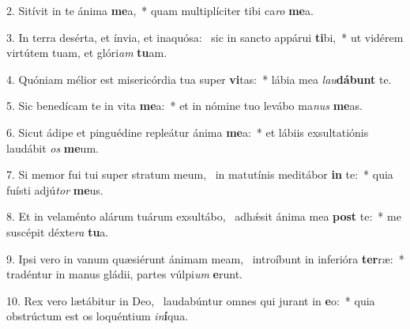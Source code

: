 2. Sitívit in te ánima \textbf{me}a,~*  quam multiplíciter tibi ca\textit{ro} \textbf{me}a.\

3. In terra desérta, et ínvia, et inaquósa: \dag\  sic in sancto appárui \textbf{ti}bi,~*  ut vidérem virtútem tuam, et glóri\textit{am} \textbf{tu}am.\

4. Quóniam mélior est misericórdia tua super \textbf{vi}tas:~*  lábia mea \textit{lau}\textbf{dá}\textbf{bunt} te.\

5. Sic benedícam te in vita \textbf{me}a:~*  et in nómine tuo levábo ma\textit{nus} \textbf{me}as.\

6. Sicut ádipe et pinguédine repleátur ánima \textbf{me}a:~*  et lábiis exsultatiónis laudábit \textit{os} \textbf{me}um.\

7. Si memor fui tui super stratum meum, \dag\  in matutínis meditábor \textbf{in} te:~*  quia fuísti adjú\textit{tor} \textbf{me}us.\

8. Et in velaménto alárum tuárum exsultábo, \dag\  adhǽsit ánima mea \textbf{post} te:~*  me suscépit déxte\textit{ra} \textbf{tu}a.\

9. Ipsi vero in vanum quæsiérunt ánimam meam, \dag\  introíbunt in inferióra \textbf{ter}ræ:~*  tradéntur in manus gládii, partes vúlpi\textit{um} \textbf{e}runt.\

10. Rex vero lætábitur in Deo, \dag\  laudabúntur omnes qui jurant in \textbf{e}o:~*  quia obstrúctum est os loquéntium \textit{in}\textbf{í}qua.\

